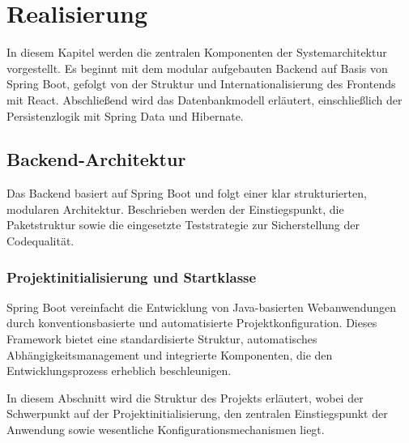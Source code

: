 \chapter{Realisierung}

In diesem Kapitel werden die zentralen Komponenten der Systemarchitektur vorgestellt. Es beginnt mit dem modular aufgebauten Backend auf Basis von Spring Boot, gefolgt von der Struktur und Internationalisierung des Frontends mit React. Abschließend wird das Datenbankmodell erläutert, einschließlich der Persistenzlogik mit Spring Data und Hibernate.

\section{Backend-Architektur}
 
Das Backend basiert auf Spring Boot und folgt einer klar strukturierten, modularen Architektur. Beschrieben werden der Einstiegspunkt, die Paketstruktur sowie die eingesetzte Teststrategie zur Sicherstellung der Codequalität.

\subsection{Projektinitialisierung und Startklasse}

Spring Boot vereinfacht die Entwicklung von Java-basierten Webanwendungen durch konventionsbasierte und automatisierte Projektkonfiguration. Dieses Framework bietet eine standardisierte Struktur, automatisches Abhängigkeitsmanagement und integrierte Komponenten, die den Entwicklungsprozess erheblich beschleunigen.

\noindent In diesem Abschnitt wird die Struktur des Projekts erläutert, wobei der Schwerpunkt auf der Projektinitialisierung, den zentralen Einstiegspunkt der Anwendung sowie wesentliche Konfigurationsmechanismen liegt.

